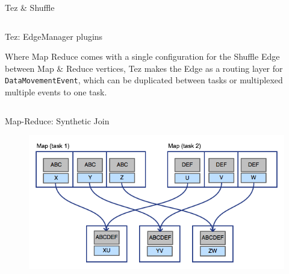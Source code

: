 \documentclass[final]{beamer}
\newlength{\onecolwid}
\newlength{\twocolwid}
\begin{document}
\begin{frame}[t]
\begin{columns}[t]
\begin{column}{\twocolwid}
\begin{columns}[t,totalwidth=\twocolwid]
\begin{column}{\onecolwid}
\begin{block}{Tez \& Shuffle}
\end{block}


\end{column} %

\end{columns} %


\begin{alertblock}{Tez: EdgeManager plugins}

Where Map Reduce comes with a single configuration for the Shuffle Edge between Map \& Reduce vertices,
Tez makes the Edge as a routing layer for \texttt{DataMovementEvent}, which can be duplicated
between tasks or multiplexed multiple events to one task.

\end{alertblock} 


\begin{columns}[t,totalwidth=\twocolwid] %

\begin{column}{\onecolwid} %


\begin{block}{Map-Reduce: Synthetic Join}

\begin{figure}
\includegraphics{figures/gfcross.png}
\end{figure}


\end{block}
\end{column}
\end{columns}
\end{column}
\end{columns}
\end{frame}
\end{document}

